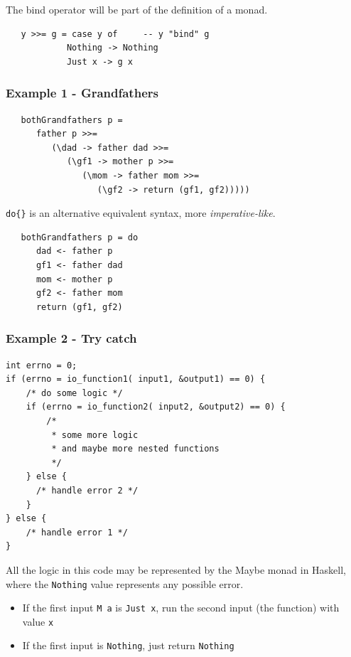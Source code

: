 The bind operator will be part of the definition
of a monad.

\begin{lstlisting}
   y >>= g = case y of     -- y "bind" g
            Nothing -> Nothing
            Just x -> g x
\end{lstlisting}

\subsubsection{Example 1 - Grandfathers}
\begin{lstlisting}
   bothGrandfathers p =
      father p >>= 
         (\dad -> father dad >>= 
            (\gf1 -> mother p >>= 
               (\mom -> father mom >>= 
                  (\gf2 -> return (gf1, gf2)))))
\end{lstlisting}
   
\lstinline|do{}| is an alternative equivalent syntax, more \textit{imperative-like}.
\begin{lstlisting}
   bothGrandfathers p = do
      dad <- father p
      gf1 <- father dad
      mom <- mother p
      gf2 <- father mom
      return (gf1, gf2)
\end{lstlisting}

\subsubsection{Example 2 - Try catch}
\begin{lstlisting}
int errno = 0;
if (errno = io_function1( input1, &output1) == 0) {
    /* do some logic */
    if (errno = io_function2( input2, &output2) == 0) {
        /*
         * some more logic
         * and maybe more nested functions
         */
    } else {
      /* handle error 2 */
    }
} else {
    /* handle error 1 */
}

\end{lstlisting}

All the logic in this code may be represented by the Maybe monad in Haskell, where the \lstinline|Nothing| value represents any possible error.

\begin{itemize}
   \item If the first input \lstinline|M a| is \lstinline|Just x|, run the second input (the function) with value \lstinline|x|
   \item If the first input is \lstinline|Nothing|, just return \lstinline|Nothing|
\end{itemize}

